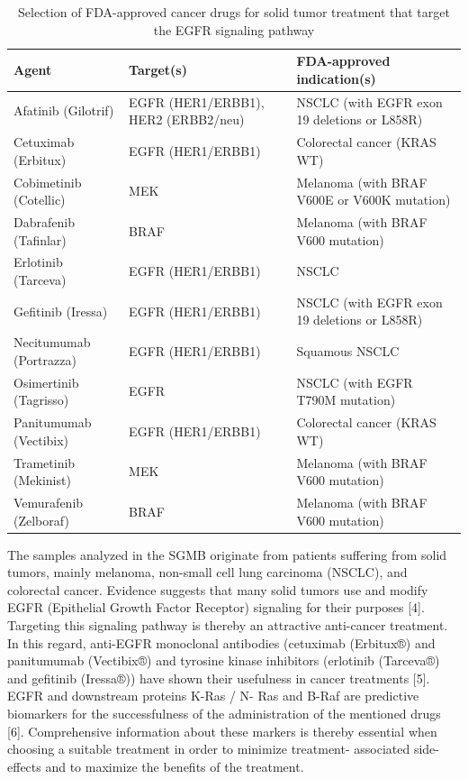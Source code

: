 \begin{table}[!htbp]
    \caption[Targeted Cancer Agents]{Selection of FDA-approved cancer drugs for solid tumor treatment that target the EGFR signaling pathway}
    \centering
    \begin{tabular}{ |p{4.5cm}|p{2cm}|p{4.5cm}|}
    \hline
    Agent & Target(s) & FDA-approved indication(s) \\ \hline \hline
    Afatinib (Gilotrif) & EGFR (HER1/ERBB1), HER2 (ERBB2/neu) & NSCLC (with EGFR exon 19 deletions or L858R) \\
    Cetuximab (Erbitux) & EGFR (HER1/ERBB1) & Colorectal cancer (KRAS WT) \\
    Cobimetinib (Cotellic) & MEK & Melanoma (with BRAF V600E or V600K mutation) \\
    Dabrafenib (Tafinlar) & BRAF & Melanoma (with BRAF V600 mutation) \\
    Erlotinib (Tarceva) & EGFR (HER1/ERBB1) & NSCLC \\
    Gefitinib (Iressa) & EGFR (HER1/ERBB1) & NSCLC (with EGFR exon 19 deletions or L858R) \\
    Necitumumab (Portrazza) & EGFR (HER1/ERBB1) & Squamous NSCLC \\
    Osimertinib (Tagrisso) & EGFR & NSCLC (with EGFR T790M mutation) \\
    Panitumumab (Vectibix) & EGFR (HER1/ERBB1) & Colorectal cancer (KRAS WT) \\
    Trametinib (Mekinist) & MEK & Melanoma (with BRAF V600 mutation) \\
    Vemurafenib (Zelboraf) & BRAF & Melanoma (with BRAF V600 mutation) \\
    \hline
  \end{tabular}
\end{table}

The samples analyzed in the SGMB originate from patients suffering from solid
tumors, mainly melanoma, non-small cell lung carcinoma (NSCLC), and colorectal
cancer. Evidence suggests that many solid tumors use and modify EGFR (Epithelial
Growth Factor Receptor) signaling for their purposes [4]. Targeting this
signaling pathway is thereby an attractive anti-cancer treatment. In this
regard, anti-EGFR monoclonal antibodies (cetuximab (Erbitux®) and panitumumab
(Vectibix®) and tyrosine kinase inhibitors (erlotinib (Tarceva®) and gefitinib
(Iressa®)) have shown their usefulness in cancer treatments [5]. EGFR and
downstream proteins K-Ras / N- Ras and B-Raf are predictive biomarkers for the
successfulness of the administration of the mentioned drugs [6]. Comprehensive
information about these markers is thereby essential when choosing a suitable
treatment in order to minimize treatment- associated side-effects and to
maximize the benefits of the treatment.

